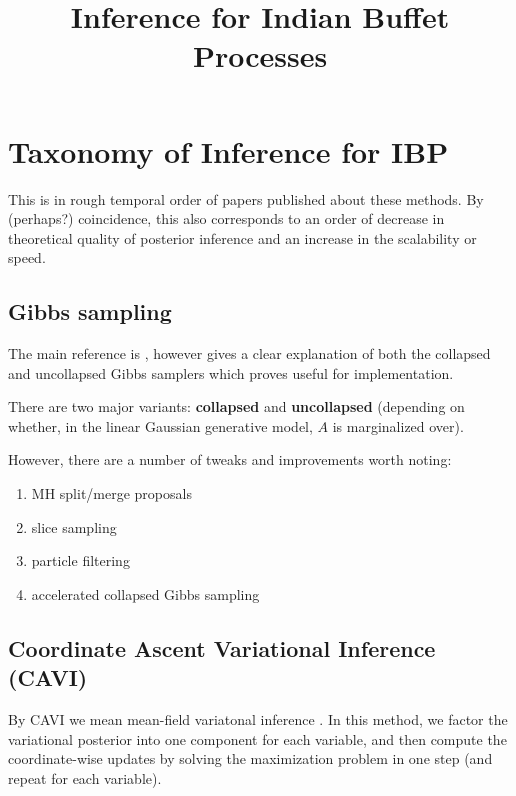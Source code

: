 \documentclass[a4paper, 11pt]{article}
\title{Inference for Indian Buffet Processes}
\author{}
\begin{document}
\maketitle
\tableofcontents

\section{Taxonomy of Inference for IBP}
This is in rough temporal order of papers published about these methods. By (perhaps?) coincidence, this also corresponds to an order of decrease in theoretical quality of posterior inference and an increase in the scalability or speed.

\subsection{Gibbs sampling}

The main reference is \citet{ghahramani2006infinite}, however \citet{doshi2009report} gives a clear explanation of both the collapsed and uncollapsed Gibbs samplers which proves useful for implementation.

\medskip

There are two major variants: \textbf{collapsed} and \textbf{uncollapsed} (depending on whether, in the linear Gaussian generative model, $A$ is marginalized over).

\medskip

However, there are a number of tweaks and improvements worth noting:
\begin{enumerate}
    \item MH split/merge proposals \citep{meeds2007modeling}
    \item slice sampling \citep{teh2007stick}
    \item particle filtering \citep{wood2007particle}
    \item accelerated collapsed Gibbs sampling  \citep{doshi2009accelerated}
\end{enumerate}

\subsection{Coordinate Ascent Variational Inference (CAVI)}
By CAVI we mean mean-field variatonal inference \citep{beal2003variational, wainwright2008graphical}. In this method, we factor the variational posterior into one component for each variable, and then compute the coordinate-wise updates by solving the maximization problem in one step (and repeat for each variable).
\end{document}
